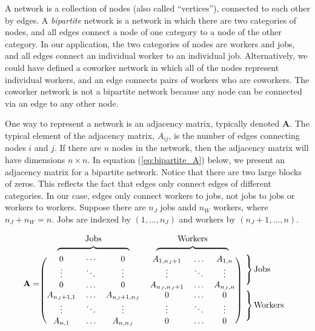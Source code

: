 \documentclass[12pt]{article}
\theoremstyle{definition}
\theoremstyle{plain}
\begin{document}
\label{sec:bipartite_network_details}

A network is a collection of nodes (also called ``vertices''), connected to each other by edges. A \emph{bipartite} network is a network in which there are two categories of nodes, and all edges connect a node of one category to a node of the other category. In our application, the two categories of nodes are workers and jobs, and all edges connect an individual worker to an individual job. Alternatively, we could have defined a coworker network in which all of the nodes represent individual workers, and an edge connects pairs of workers who are coworkers. The coworker network is not a bipartite network because any node can be connected via an edge to any other node. 

One way to represent a network is an adjacency matrix, typically denoted $\mathbf{A}$. The typical element of the adjacency matrix, $A_{ij}$, is the number of edges connecting nodes $i$ and $j$. If there are $n$ nodes in the network, then the adjacency matrix will have dimensions $n \times n$. In equation (\ref{eq:bipartite_A}) below, we present an adjacency matrix for a bipartite network. Notice that there are two large blocks of zeros. This reflects the fact that edges only connect edges of different categories. In our case, edges only connect workers to jobs, not jobs to jobs or workers to workers. Suppose there are $n_J$ jobs andd $n_W$ workers, where $n_J+n_W=n$. Jobs are indexed by $(1,\dots,n_J)$ and workers by $(n_J+1,\dots, n)$.

\begin{align*}
\mathbf{A} = 
\begin{blockarray}{ccccccc}
\multicolumn{3}{c}{Jobs} & \multicolumn{3}{c}{Workers} & \\
\multicolumn{3}{c}{$\overbrace{\rule{3cm}{0pt}}$} & \multicolumn{3}{c}{$\overbrace{\rule{3cm}{0pt}}$} & \\
\begin{block}{(cccccc)l}
0 		& \cdots	& 0 		&  A_{1,n_J+1} 	& \dots 	& A_{1,n} 	& \rdelim\} {3}{10pt} \multirow{3}{*}{Jobs } \\
\vdots	& \ddots	& \vdots	& \vdots 		& \ddots 	& \vdots 	& \\
0		& \hdots	& 0	 		& A_{n_J,n_J+1} & \dots 	& A_{n_J,n}	& \\
A_{n_J+1,1} & \hdots	& A_{n_J+1,n_J} & 0 	 	& \dots 	& 0 		&   \rdelim\} {3}{10pt}\multirow{3}{*}{Workers }	\\
\vdots		& \ddots	& \vdots		& \vdots 	& \ddots 	& \vdots	& \\
A_{n,1}		& \hdots	& A_{n,n_J}		& 0 	 	& \dots 	& 0 		& \\
\end{block}
\end{blockarray}
\label{eq:bipartite_A}
\end{align*}
\end{document}
